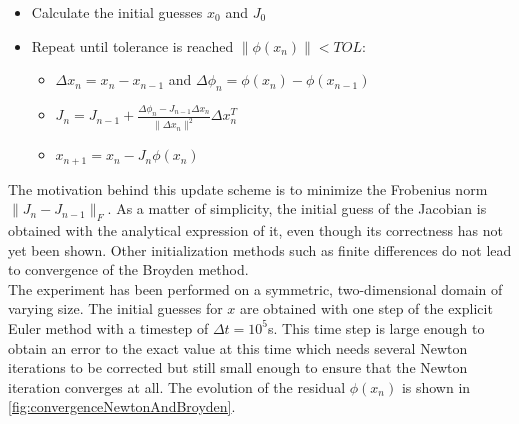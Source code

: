\documentclass{report}
\begin{document}
\begin{itemize}
	\item Calculate the initial guesses $x_0$ and $J_0$
	\item Repeat until tolerance is reached $\|\phi(x_n)\| < TOL$: 
	\begin{itemize}
		\item $\Delta x_n = x_n - x_{n-1}$ and $\Delta \phi_n = \phi(x_n) - \phi(x_{n-1})$ 
		\item $J_n = J_{n-1} + \frac{\Delta \phi_n - J_{n-1}\Delta x_n}{\|\Delta x_n\|^2} \Delta x_n^T$
		\item $x_{n+1} = x_n - J_n \phi(x_n)$
	\end{itemize} 
\end{itemize}

The motivation behind this update scheme is to minimize the Frobenius norm $\|J_n - J_{n-1}\|_F$. As a matter of simplicity, the initial guess of the Jacobian is obtained with the analytical expression of it, even though its correctness has not yet been shown. Other initialization methods such as finite differences do not lead to convergence of the Broyden method. \\
The experiment has been performed on a symmetric, two-dimensional domain of varying size. The initial guesses for $x$ are obtained with one step of the explicit Euler method with a timestep of $\Delta t = 10^5$s. This time step is large enough to obtain an error to the exact value at this time which needs several Newton iterations to be corrected but still small enough to ensure that the Newton iteration converges at all. The evolution of the residual $\phi(x_n)$ is shown in \autoref{fig:convergenceNewtonAndBroyden}.
\end{document}
